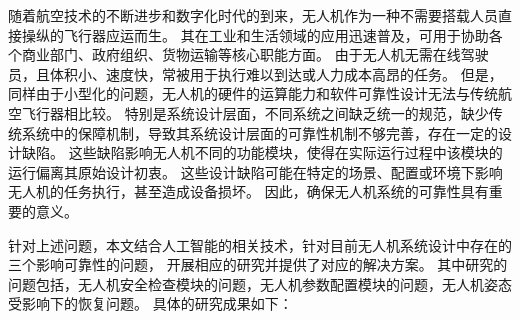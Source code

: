 随着航空技术的不断进步和数字化时代的到来，无人机作为一种不需要搭载人员直接操纵的飞行器应运而生。
其在工业和生活领域的应用迅速普及，可用于协助各个商业部门、政府组织、货物运输等核心职能方面。
由于无人机无需在线驾驶员，且体积小、速度快，常被用于执行难以到达或人力成本高昂的任务。
但是，同样由于小型化的问题，无人机的硬件的运算能力和软件可靠性设计无法与传统航空飞行器相比较。
特别是系统设计层面，不同系统之间缺乏统一的规范，缺少传统系统中的保障机制，导致其系统设计层面的可靠性机制不够完善，存在一定的设计缺陷。
这些缺陷影响无人机不同的功能模块，使得在实际运行过程中该模块的运行偏离其原始设计初衷。
这些设计缺陷可能在特定的场景、配置或环境下影响无人机的任务执行，甚至造成设备损坏。
因此，确保无人机系统的可靠性具有重要的意义。

针对上述问题，本文结合人工智能的相关技术，针对目前无人机系统设计中存在的三个影响可靠性的问题，
开展相应的研究并提供了对应的解决方案。
其中研究的问题包括，无人机安全检查模块的问题，无人机参数配置模块的问题，无人机姿态受影响下的恢复问题。
具体的研究成果如下：

